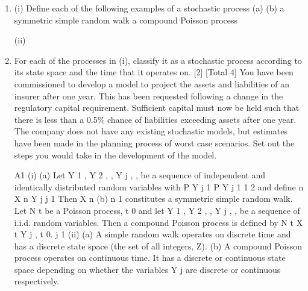 \documentclass[a4paper,12pt]{article}
\begin{document}
\begin{enumerate}
\item 
(i)
Define each of the following examples of a stochastic process
(a)
(b)
a symmetric simple random walk
a compound Poisson process

(ii)
\item %
For each of the processes in (i), classify it as a stochastic process according to its state space and the time that it operates on.
[2]
[Total 4]
You have been commissioned to develop a model to project the assets and liabilities of an insurer after one year. This has been requested following a change in the regulatory capital requirement. Sufficient capital must now be held such that there is
less than a 0.5\% chance of liabilities exceeding assets after one year.
The company does not have any existing stochastic models, but estimates have been made in the planning process of worst case scenarios.
Set out the steps you would take in the development of the model.

A1
(i)
(a)
Let Y 1 , Y 2 , , Y j , , be a sequence of independent and identically
distributed random variables with
P Y j
1
P Y j
1
1
2
and define
n
X n
Y j
j 1
Then X n
(b)
n 1
constitutes a symmetric simple random walk.
Let N t be a Poisson process, t 0 and let Y 1 , Y 2 , , Y j , , be a sequence of i.i.d. random variables. Then a compound Poisson process is defined by
N t
X t
Y j ,
t
0.
j 1
(ii)
(a) A simple random walk operates on discrete time and has a discrete state space (the set of all integers, Z).
(b) A compound Poisson process operates on continuous time.
It has a discrete or continuous state space depending on whether the variables Y j are discrete or continuous respectively.

\newpage


\end{enumerate}
\end{document}
